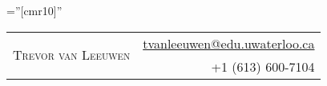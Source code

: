 \documentclass[letterpaper,10pt]{article}
\begin{document}
\pagestyle{empty} %

\font\fb=''[cmr10]'' %

\par{
    \begin{tabular}{lr}

        \multirow{2}{12.9cm}{\Huge{\textsc{Trevor van Leeuwen}}} & \href{mailto:tvanleeuwen@edu.uwaterloo.ca}{tvanleeuwen@edu.uwaterloo.ca} \\
         & +1 (613) 600-7104
    \end{tabular}
\bigskip\par}


\end{document}
